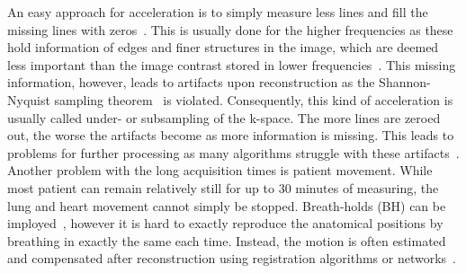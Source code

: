 An easy approach for acceleration is to simply measure less lines and fill the missing lines with zeros~\cite{DeepMRIReconstructionSubsampling}. This is usually done for the higher frequencies as these hold information of edges and finer structures in the image, which are deemed less important than the image contrast stored in lower frequencies~\cite{AdvancesPI}. This missing information, however, leads to artifacts upon reconstruction as the Shannon-Nyquist sampling theorem~\cite{Shannon} is violated. Consequently, this kind of acceleration is usually called under- or subsampling of the k-space. The more lines are zeroed out, the worse the artifacts become as more information is missing. This leads to problems for further processing as many algorithms struggle with these artifacts~\cite{DeepMRIReconstructionSubsampling}. \\
Another problem with the long acquisition times is patient movement. While most patient can remain relatively still for up to 30 minutes of measuring, the lung and heart movement cannot simply be stopped. Breath-holds (BH) can be imployed~\cite{Zaitsev2015}, however it is hard to exactly reproduce the anatomical positions by breathing in exactly the same each time. Instead, the motion is often estimated and compensated after reconstruction using registration algorithms or networks~\cite{Kuestner2022,Chen2023,GRICS}.


